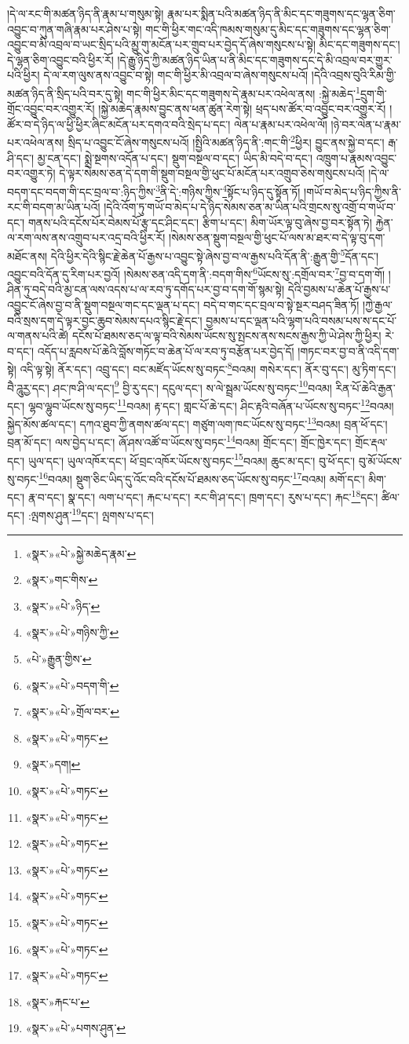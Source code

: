 །དེ་ལ་རང་གི་མཚན་ཉིད་ནི་རྣམ་པ་གསུམ་སྟེ། རྣམ་པར་སྨིན་པའི་མཚན་ཉིད་ནི་མིང་དང་གཟུགས་དང་ལྷན་ཅིག་འབྱུང་བ་ཀུན་གཞི་རྣམ་པར་ཤེས་པ་སྟེ། གང་གི་ཕྱིར་གང་འདི་ཁམས་གསུམ་དུ་མིང་དང་གཟུགས་དང་ལྷན་ཅིག་འབྱུང་བ་མི་འབྲལ་བ་ཡང་སྲིད་པའི་མྱུ་གུ་མངོན་པར་གྲུབ་པར་བྱེད་དོ་ཞེས་གསུངས་པ་སྟེ། མིང་དང་གཟུགས་དང་། དེ་ལྷན་ཅིག་འབྱུང་བའི་ཕྱིར་རོ། །དེ་རྒྱུ་ཉིད་ཀྱི་མཚན་ཉིད་ཡིན་པ་ནི་མིང་དང་གཟུགས་དང་དེ་མི་འབྲལ་བར་གྱུར་པའི་ཕྱིར། དེ་ལ་རག་ལུས་ནས་འབྱུང་བ་སྟེ། གང་གི་ཕྱིར་མི་འབྲལ་བ་ཞེས་གསུངས་པའོ། །དེའི་འབྲས་བུའི་རིམ་གྱི་མཚན་ཉིད་ནི་སྲིད་པའི་བར་དུ་སྟེ། གང་གི་ཕྱིར་མིང་དང་གཟུགས་དེ་རྣམ་པར་འཕེལ་ནས། :སྐྱེ་མཆེད་\footnote{«སྣར་»«པེ་»སྐྱེ་མཆེད་རྣམ་}དྲུག་གི་གྲོང་འབྱུང་བར་འགྱུར་རོ། །སྐྱེ་མཆེད་རྣམས་བྱུང་ནས་ཕན་ཚུན་རེག་སྟེ། ཕྲད་པས་ཚོར་བ་འབྱུང་བར་འགྱུར་རོ། །ཚོར་བ་དེ་ཉིད་ལ་ཕྱི་ཕྱིར་ཞིང་མངོན་པར་དགའ་བའི་སྲེད་པ་དང་། ལེན་པ་རྣམ་པར་འཕེལ་ལོ། །ཉེ་བར་ལེན་པ་རྣམ་པར་འཕེལ་ནས། སྲིད་པ་འབྱུང་ངོ་ཞེས་གསུངས་པའོ། །སྤྱིའི་མཚན་ཉིད་ནི་:གང་གི་\footnote{«སྣར་»གང་གིས་}ཕྱིར། བྱུང་ནས་སྐྱེ་བ་དང་། རྒ་ཤི་དང་། མྱ་ངན་དང་། སྨྲེ་སྔགས་འདོན་པ་དང་། སྡུག་བསྔལ་བ་དང་། ཡིད་མི་བདེ་བ་དང་། འཁྲུག་པ་རྣམས་འབྱུང་བར་འགྱུར་ཏེ། དེ་ལྟར་སེམས་ཅན་དེ་དག་གི་སྡུག་བསྔལ་གྱི་ཕུང་པོ་མངོན་པར་འགྲུབ་ཅེས་གསུངས་པའོ། །དེ་ལ་བདག་དང་བདག་གི་དང་བྲལ་བ་:ཉིད་ཀྱིས་\footnote{«སྣར་»«པེ་»ཉིད་}ནི་དེ་:གཉིས་ཀྱིས་\footnote{«སྣར་»«པེ་»གཉིས་ཀྱི་}སྟོང་པ་ཉིད་དུ་སྟོན་ཏོ། །གཡོ་བ་མེད་པ་ཉིད་ཀྱིས་ནི་རང་གི་བདག་མ་ཡིན་པའོ། །དེའི་འོག་ཏུ་གཡོ་བ་མེད་པ་དེ་ཉིད་སེམས་ཅན་མ་ཡིན་པའི་གྲངས་སུ་འགྲོ་བ་གཡོ་བ་དང་། གནས་པའི་དངོས་པོར་བེམས་པོ་རྩྭ་དང་ཤིང་དང་། རྩིག་པ་དང་། མིག་ཡོར་ལྟ་བུ་ཞེས་བྱ་བར་སྟོན་ཏེ། རྐྱེན་ལ་རག་ལས་ནས་འགྲུབ་པར་འདྲ་བའི་ཕྱིར་རོ། །སེམས་ཅན་སྡུག་བསྔལ་གྱི་ཕུང་པོ་ལས་མ་ཐར་བ་དེ་ལྟ་བུ་དག་མཐོང་ནས། དེའི་ཕྱིར་དེའི་སྙིང་རྗེ་ཆེན་པོ་རྒྱས་པ་འབྱུང་སྟེ་ཞེས་བྱ་བ་ལ་རྒྱས་པའི་དོན་ནི་:རྒྱུན་གྱི་\footnote{«པེ་»རྒྱུན་གྱིས་}དོན་དང་། འབྱུང་བའི་དོན་དུ་རིག་པར་བྱའོ། །སེམས་ཅན་འདི་དག་ནི་:བདག་གིས་\footnote{«སྣར་»«པེ་»བདག་གི་}ཡོངས་སུ་:དགྲོལ་བར་\footnote{«སྣར་»«པེ་»གྲོལ་བར་}བྱ་བ་དག་གོ། །ཤིན་ཏུ་བདེ་བའི་མྱ་ངན་ལས་འདས་པ་ལ་རབ་ཏུ་དགོད་པར་བྱ་བ་དག་གོ་སྙམ་སྟེ། དེའི་བྱམས་པ་ཆེན་པོ་རྒྱས་པ་འབྱུང་ངོ་ཞེས་བྱ་བ་ནི་སྡུག་བསྔལ་གང་དང་ལྡན་པ་དང་། བདེ་བ་གང་དང་བྲལ་བ་སྟེ་སྔར་བཤད་ཟིན་ཏོ། །ཀྱེ་རྒྱལ་བའི་སྲས་དག་དེ་ལྟར་བྱང་ཆུབ་སེམས་དཔའ་སྙིང་རྗེ་དང་། བྱམས་པ་དང་ལྡན་པའི་ལྷག་པའི་བསམ་པས་ས་དང་པོ་ལ་གནས་པའི་ཚེ། དངོས་པོ་ཐམས་ཅད་ལ་ལྟ་བའི་སེམས་ཡོངས་སུ་སྤངས་ནས་སངས་རྒྱས་ཀྱི་ཡེ་ཤེས་ཀྱི་ཕྱིར། རེ་བ་དང་། འདོད་པ་རླབས་པོ་ཆེའི་བློས་གཏོང་བ་ཆེན་པོ་ལ་རབ་ཏུ་བརྩོན་པར་བྱེད་དོ། །གཏང་བར་བྱ་བ་ནི་འདི་དག་སྟེ། འདི་ལྟ་སྟེ། ནོར་དང་། འབྲུ་དང་། བང་མཛོད་ཡོངས་སུ་བཏང་\footnote{«སྣར་»«པེ་»གཏང་}བའམ། གསེར་དང་། ནོར་བུ་དང་། མུ་ཏིག་དང་། བཻ་ཌཱུརྱ་དང་། ཤང་ཁ་ཤི་ལ་དང་།\footnote{«སྣར་»དག།} བྱི་རུ་དང་། དངུལ་དང་། ས་ལེ་སྦྲམ་ཡོངས་སུ་བཏང་\footnote{«སྣར་»«པེ་»གཏང་}བའམ། རིན་པོ་ཆེའི་རྒྱན་དང་། ལྷབ་ལྷུབ་ཡོངས་སུ་བཏང་\footnote{«སྣར་»«པེ་»གཏང་}བའམ། རྟ་དང་། གླང་པོ་ཆེ་དང་། ཤིང་རྟའི་བཞོན་པ་ཡོངས་སུ་བཏང་\footnote{«སྣར་»«པེ་»གཏང་}བའམ། སྐྱེད་མོས་ཚལ་དང་། དཀའ་ཐུབ་ཀྱི་ནགས་ཚལ་དང་། གཙུག་ལག་ཁང་ཡོངས་སུ་བཏང་\footnote{«སྣར་»«པེ་»གཏང་}བའམ། བྲན་ཕོ་དང་། བྲན་མོ་དང་། ལས་བྱེད་པ་དང་། ཞོ་ཤས་འཚོ་བ་ཡོངས་སུ་བཏང་\footnote{«སྣར་»«པེ་»གཏང་}བའམ། གྲོང་དང་། གྲོང་ཁྱེར་དང་། གྲོང་རྡལ་དང་། ཡུལ་དང་། ཡུལ་འཁོར་དང་། ཕོ་བྲང་འཁོར་ཡོངས་སུ་བཏང་\footnote{«སྣར་»«པེ་»གཏང་}བའམ། ཆུང་མ་དང་། བུ་ཕོ་དང་། བུ་མོ་ཡོངས་སུ་བཏང་\footnote{«སྣར་»«པེ་»གཏང་}བའམ། སྡུག་ཅིང་ཡིད་དུ་འོང་བའི་དངོས་པོ་ཐམས་ཅད་ཡོངས་སུ་བཏང་\footnote{«སྣར་»«པེ་»གཏང་}བའམ། མགོ་དང་། མིག་དང་། རྣ་བ་དང་། སྣ་དང་། ལག་པ་དང་། རྐང་པ་དང་། རང་གི་ཤ་དང་། ཁྲག་དང་། རུས་པ་དང་། རྐང་\footnote{«སྣར་»རྐང་པ་}དང་། ཚིལ་དང་། :ལྤགས་ཤུན་\footnote{«སྣར་»«པེ་»པགས་ཤུན་}དང་། ལྤགས་པ་དང་། 